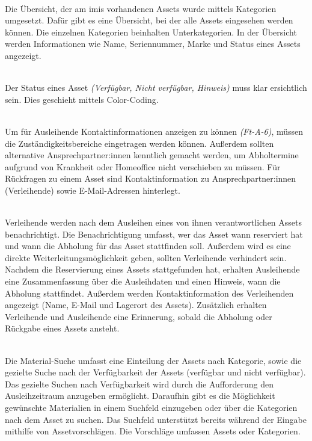     {\sffamily\color{maincolor}{Ft-VA-2 | Übersicht über ausleihbare Assets }}\\
Die Übersicht, der am \ac{imis} vorhandenen Assets wurde mittels Kategorien umgesetzt. Dafür gibt es
eine Übersicht, bei der alle Assets eingesehen werden können. Die einzelnen Kategorien beinhalten
Unterkategorien. In der Übersicht werden Informationen wie Name, Seriennummer, Marke und Status
eines Assets angezeigt.

    {\sffamily\color{maincolor}{Ft-VA-3 |  Verfügbarkeit von Assets }}\\
Der Status eines Asset \textit{(Verfügbar, Nicht verfügbar, Hinweis)} muss klar ersichtlich sein.
Dies geschieht mittels Color-Coding.  


{\sffamily\color{maincolor}{Ft-VA-4 | Zuständigkeitsbereich }}\\
Um für Ausleihende Kontaktinformationen anzeigen zu können \textit{(Ft-A-6)}, müssen die
Zuständigkeitsbereiche eingetragen werden können. Außerdem sollten alternative Ansprechpartner:innen
kenntlich gemacht werden, um Abholtermine aufgrund von Krankheit oder Homeoffice nicht verschieben
zu müssen. Für Rückfragen zu einem Asset sind Kontaktinformation zu Ansprechpartner:innen
(Verleihende) sowie E-Mail-Adressen hinterlegt.

    {\sffamily\color{maincolor}{Ft-VA-5 | Benachrichtigungen \& Erinnerungen }}\\
Verleihende werden nach dem Ausleihen eines von ihnen verantwortlichen Assets benachrichtigt. Die
Benachrichtigung umfasst, wer das Asset wann reserviert hat und wann die Abholung für
das Asset stattfinden soll. Außerdem wird es eine direkte Weiterleitungsmöglichkeit geben, sollten
Verleihende verhindert sein. Nachdem die Reservierung eines Assets stattgefunden hat, erhalten
Ausleihende eine Zusammenfassung über die Ausleihdaten und einen Hinweis, wann die Abholung
stattfindet. Außerdem werden Kontaktinformation des Verleihenden angezeigt (Name, E-Mail und
Lagerort des Assets). Zusätzlich erhalten Verleihende und Ausleihende eine Erinnerung, sobald die
Abholung oder Rückgabe eines Assets ansteht.


    {\sffamily\color{maincolor}{Ft-VA-6 | Material-Suche }}\\
Die Material-Suche umfasst eine Einteilung der Assets nach Kategorie, sowie die gezielte Suche nach
der Verfügbarkeit der Assets (verfügbar und nicht verfügbar). Das gezielte Suchen nach
Verfügbarkeit wird durch die Aufforderung den Ausleihzeitraum anzugeben ermöglicht. Daraufhin gibt
es die Möglichkeit gewünschte Materialien in einem Suchfeld einzugeben oder über die Kategorien nach
dem Asset zu suchen. Das Suchfeld unterstützt bereits während der Eingabe mithilfe von
Assetvorschlägen. Die Vorschläge umfassen Assets oder Kategorien.

